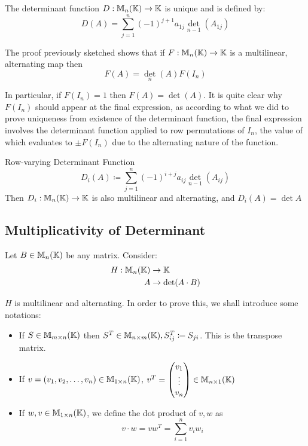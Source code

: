 \begin{recall}
    The determinant function \(D: \mathbb{M}_n(\mathbb{K}) \to \mathbb{K}\) is unique and is defined by:
    \[
        D(A) = \sum_{j=1}^{n} (-1)^{j+1} a_{1j} \det_{n-1}(A_{1j})
    \]
\end{recall}

\begin{proposition}
    The proof previously sketched shows that if \(F: \mathbb{M}_n(\mathbb{K}) \to \mathbb{K}\) is a multilinear, alternating map then \[
        F(A) = \det_n(A) F(I_n)
    \]

    In particular, if \(F(I_n) = 1\) then \(F(A) = \det(A)\). It is quite clear why \(F(I_n)\) should appear at the final expression, as according to what we did to prove uniqueness from existence of the determinant function, the final expression involves the determinant function applied to row permutations of \(I_n\), the value of which evaluates to \(\pm F(I_n)\) due to the alternating nature of the function.
\end{proposition}

\begin{definition} {Row-varying Determinant Function}
    \[
        D_i(A) \coloneqq \sum_{j=1}^{n}(-1)^{i+j}a_{ij} \det_{n-1}(A_{ij})
    \]
    Then \(D_i: \mathbb{M}_n(\mathbb{K}) \to \mathbb{K}\) is also multilinear and alternating, and \(D_i(A) = \det A\)
\end{definition}

\subsection{Multiplicativity of Determinant}
Let \(B \in \mathbb{M}_n(\mathbb{K})\) be any matrix. Consider: \begin{align*}
    H: \mathbb{M}_n(\mathbb{K}) & \to \mathbb{K}            \\
    A               & \to \det(A \cdot B)
\end{align*}

\begin{claim}
    \(H\) is multilinear and alternating. In order to prove this, we shall introduce some notations:
    \begin{itemize}
        \item If \(S \in \mathbb{M}_{m \times n}(\mathbb{K})\) then \(S^T \in \mathbb{M}_{n \times m}(\mathbb{K}),  S^T_{ij} \coloneqq S_{ji}\). This is the transpose matrix.
        \item If \(v = (v_1, v_2, \dots, v_n) \in \mathbb{M}_{1 \times n}(\mathbb{K})\), \(v^T = \begin{pmatrix}
                  v_1    \\
                  \vdots \\
                  v_n
              \end{pmatrix} \in \mathbb{M}_{n \times 1}(\mathbb{K}) \)
        \item If \(w, v \in \mathbb{M}_{1 \times n}(\mathbb{K})\), we define the dot product of \(v, w\) as \[
                  v \cdot w = vw^T = \sum_{i=1}^{n}v_i w_i
              \]
    \end{itemize}
\end{claim}


